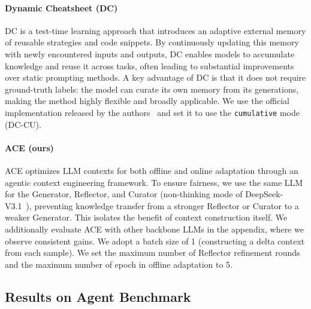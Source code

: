 \paragraph{Dynamic Cheatsheet (DC)~\citep{suzgun2025dynamic}} DC is a test-time learning approach that introduces an adaptive external memory of reusable strategies and code snippets.  
By continuously updating this memory with newly encountered inputs and outputs, DC enables models to accumulate knowledge and reuse it across tasks, often leading to substantial improvements over static prompting methods.  
A key advantage of DC is that it does not require ground-truth labels: the model can curate its own memory from its generations, making the method highly flexible and broadly applicable.  
We use the official implementation released by the authors~\citep{Suzgun2025_DynamicCheatsheet_code} and set it to use the \texttt{cumulative} mode (DC-CU).

\paragraph{ACE (ours)} ACE optimizes LLM contexts for both offline and online adaptation through an agentic context engineering framework.  
To ensure fairness, we use the same LLM for the Generator, Reflector, and Curator (non-thinking mode of DeepSeek-V3.1~\citep{deepseekai2024deepseekv3technicalreport}), preventing knowledge transfer from a stronger Reflector or Curator to a weaker Generator. 
This isolates the benefit of context construction itself. 
We additionally evaluate ACE with other backbone LLMs in the appendix, where we observe consistent gains.
We adopt a batch size of 1 (constructing a delta context from each sample).
We set the maximum number of Reflector refinement rounds and the maximum number of epoch in offline adaptation to 5. 

\subsection{Results on Agent Benchmark}
\label{subsec:agent-main-results}

